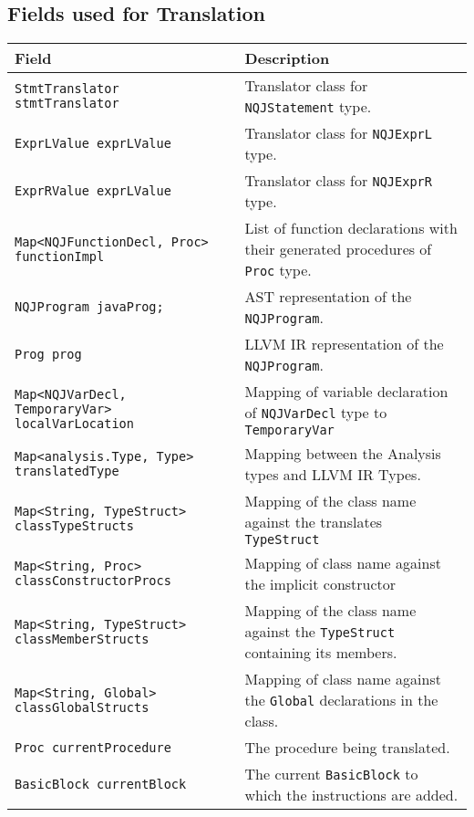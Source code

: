\documentclass[]{tukportfolio}
\begin{document}
\subsection{Fields used for Translation}
\begin{center}
	\begin{longtable}{| m{}|m{}|}
		\hline
		\textbf{Field} & \textbf{Description}\\
		\hline
		\lstinline|StmtTranslator stmtTranslator| &	Translator class for \lstinline|NQJStatement| type.\\
		\hline
		\lstinline|ExprLValue exprLValue| &	Translator class for \lstinline|NQJExprL| type.\\
		\hline
		\lstinline|ExprRValue exprLValue| &	Translator class for \lstinline|NQJExprR| type.\\
		\hline
		\lstinline|Map<NQJFunctionDecl, Proc> functionImpl| &	List of function declarations with their generated procedures of \lstinline|Proc| type.\\
		\hline
		\lstinline|NQJProgram javaProg;| \label{program}&	AST representation of the \lstinline|NQJProgram|.\\
		\hline
		\lstinline|Prog prog| &	LLVM IR representation of the \lstinline|NQJProgram|.\\
		\hline
		\lstinline|Map<NQJVarDecl, TemporaryVar> localVarLocation| &	Mapping of variable declaration of \lstinline|NQJVarDecl| type to \lstinline|TemporaryVar|\\
		\hline
		\lstinline|Map<analysis.Type, Type> translatedType| & Mapping between the Analysis types and LLVM IR Types.\\
		\hline
		\lstinline|Map<String, TypeStruct> classTypeStructs| \label{classes}& Mapping of the class name against the translates \lstinline|TypeStruct|\\
		\hline
		\lstinline|Map<String, Proc> classConstructorProcs| & Mapping of class name against the implicit constructor\\
		\hline
		\lstinline|Map<String, TypeStruct> classMemberStructs| & Mapping of the class name against the \lstinline|TypeStruct| containing its members.\\
		\hline
		\lstinline|Map<String, Global> classGlobalStructs| &  Mapping of class name against the \lstinline|Global| declarations in the class.\\
		\hline
		\lstinline|Proc currentProcedure| & The procedure being translated.\\
		\hline
		\lstinline|BasicBlock currentBlock| & The current \lstinline|BasicBlock| to which the instructions are added.\\

\end{longtable}
\end{center}
\end{document}

